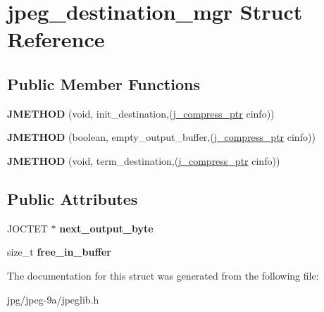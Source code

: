 \hypertarget{structjpeg__destination__mgr}{\section{jpeg\+\_\+destination\+\_\+mgr Struct Reference}
\label{structjpeg__destination__mgr}
}
\subsection*{Public Member Functions}
\begin{DoxyCompactItemize}
\item 
\hypertarget{structjpeg__destination__mgr_ae29d14eb632140c7c67eda8c5824383c}{{\bfseries J\+M\+E\+T\+H\+O\+D} (void, init\+\_\+destination,(\hyperlink{structjpeg__compress__struct}{j\+\_\+compress\+\_\+ptr} cinfo))}\label{structjpeg__destination__mgr_ae29d14eb632140c7c67eda8c5824383c}

\item 
\hypertarget{structjpeg__destination__mgr_a7357b5d5cab543cfa243dd59f101b8f2}{{\bfseries J\+M\+E\+T\+H\+O\+D} (boolean, empty\+\_\+output\+\_\+buffer,(\hyperlink{structjpeg__compress__struct}{j\+\_\+compress\+\_\+ptr} cinfo))}\label{structjpeg__destination__mgr_a7357b5d5cab543cfa243dd59f101b8f2}

\item 
\hypertarget{structjpeg__destination__mgr_a1158df5e49ecfa2a7d0905eef216afbf}{{\bfseries J\+M\+E\+T\+H\+O\+D} (void, term\+\_\+destination,(\hyperlink{structjpeg__compress__struct}{j\+\_\+compress\+\_\+ptr} cinfo))}\label{structjpeg__destination__mgr_a1158df5e49ecfa2a7d0905eef216afbf}

\end{DoxyCompactItemize}
\subsection*{Public Attributes}
\begin{DoxyCompactItemize}
\item 
\hypertarget{structjpeg__destination__mgr_a3dac0ab8cc4daeb1efb9fea2e07449c0}{J\+O\+C\+T\+E\+T $\ast$ {\bfseries next\+\_\+output\+\_\+byte}}\label{structjpeg__destination__mgr_a3dac0ab8cc4daeb1efb9fea2e07449c0}

\item 
\hypertarget{structjpeg__destination__mgr_a397cc63a089447fe96e35062c4979906}{size\+\_\+t {\bfseries free\+\_\+in\+\_\+buffer}}\label{structjpeg__destination__mgr_a397cc63a089447fe96e35062c4979906}

\end{DoxyCompactItemize}


The documentation for this struct was generated from the following file\+:\begin{DoxyCompactItemize}
\item 
jpg/jpeg-\/9a/jpeglib.\+h\end{DoxyCompactItemize}
